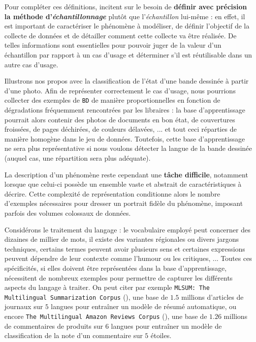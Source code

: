 			Pour compléter ces définitions, \cite{kruskal-mosteller:1979:representative-sampling-ii} incitent sur le besoin de \textbf{définir avec précision la méthode d'\textit{échantillonnage}} plutôt que l'\textit{échantillon} lui-même : en effet, il est important de caractériser le phénomène à modéliser, de définir l'objectif de la collecte de données et de détailler comment cette collecte va être réalisée. 
			De telles informations sont essentielles pour pouvoir juger de la valeur d'un échantillon par rapport à un cas d'usage et déterminer s'il est réutilisable dans un autre cas d'usage.
			\begin{leftBarExamples}
				Illustrons nos propos avec la classification de l'état d'une bande dessinée à partir d'une photo.
				Afin de représenter correctement le cas d'usage, nous pourrions collecter des exemples de \texttt{BD} de manière proportionnelles en fonction de dégradations fréquemment rencontrées par les libraires : la base d'apprentissage pourrait alors contenir des photos de documents en bon état, de couvertures froissées, de pages déchirées, de couleurs délavées, ... et tout ceci réparties de manière homogène dans le jeu de données.
				Toutefois, cette base d'apprentissage ne sera plus représentative si nous voulons détecter la langue de la bande dessinée (auquel cas, une répartition sera plus adéquate).
			\end{leftBarExamples}
			
			La description d'un phénomène reste cependant une \textbf{tâche difficile}, notamment lorsque que celui-ci possède un ensemble vaste et abstrait de caractéristiques à décrire.
			Cette complexité de représentation conditionne alors le nombre d'exemples nécessaires pour dresser un portrait fidèle du phénomène, imposant parfois des volumes colossaux de données.
			\begin{leftBarExamples}
				Considérons le traitement du langage : le vocabulaire employé peut concerner des dizaines de millier de mots, il existe des variantes régionales ou divers jargons techniques, certains termes peuvent avoir plusieurs sens et certaines expressions peuvent dépendre de leur contexte comme l'humour ou les critiques, ...
				Toutes ces spécificités, si elles doivent être représentées dans la base d'apprentissage, nécessitent de nombreux exemples pour permettre de capturer les différents aspects du langage à traiter.
				On peut citer par exemple \texttt{MLSUM: The Multilingual Summarization Corpus} (\cite{scialom-etal:2020:mlsum-multilingual-summarization}), une base de $1.5$ millions d'articles de journaux sur $5$ langues pour entraîner un modèle de résumé automatique, ou encore \texttt{The Multilingual Amazon Reviews Corpus} (\cite{keung-etal:2020:multilingual-amazon-reviewsa}), une base de $1.26$ millions de commentaires de produits sur $6$ langues pour entraîner un modèle de classification de la note d'un commentaire sur $5$ étoiles.
			\end{leftBarExamples}
			
